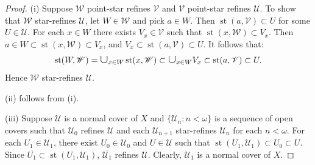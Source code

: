 \documentclass[main.tex]{subfiles}
\begin{document}
\begin{proof} 
	(i) Suppose $\mathscr{W}$ point-star refines $\mathscr{V}$ and $\mathscr{V}$ 
	point-star refines $\mathscr{U}$. To show
	that $\mathscr{W}$ star-refines $\mathscr{U}$, let $W \in \mathscr{W}$ and pick $a \in W$.
	Then $\operatorname{st}(a, \mathscr{V}) \subset U$ for some $U \in \mathscr{U}$. 
	For each $x \in W$ there exists $V_x \in \mathscr{V}$ such that 
	$\operatorname{st}(x, \mathscr{W}) \subset V_x$. Then 
	$a \in W \subset \operatorname{st}(x, \mathscr{W}) \subset V_x$, and 
	$V_x \subset \operatorname{st}(a, \mathscr{V}) \subset U$. It follows that:
	$$\operatorname{st}(W, \mathscr{W}) =  \scalebox{1.4}{$\cup$}_{x \in W} 
	\operatorname{st}(x, \mathscr{W}) \subset  \scalebox{1.4}{$\cup$}_{x \in W} V_x 
	\subset\operatorname{st}(a, \mathscr{V}) \subset U.$$  
	Hence $\mathscr{W}$ star-refines $\mathscr{U}$.  
	
	(ii) follows from (i). 
	
	(iii) Suppose $\mathscr{U}$ is a normal cover of $X$ and $\{\mathscr{U}_n: n<\omega\}$ 
	is a sequence of open covers such that $\mathscr{U}_0$ refines $\mathscr{U}$ and each $\mathscr{U}_{n+1}$ star-refines $\mathscr{U}_n$ for each $n <\omega$. For each $U_1 \in \mathscr{U}_1$, there exist
	$U_0 \in \mathscr{U}_0$ and $U \in \mathscr{U}$ such that 
	$\operatorname{st}(U_1, \mathscr{U}_1) \subset U_0 \subset U$. 
	Since $\overline{U_1} \subset \operatorname{st}(U_1, \mathscr{U}_1)$,
	$\overline{\mathscr{U}_1}$ refines $\mathscr{U}$. 
	Clearly, $\mathscr{U}_1$ is a normal cover of $X$. 
\end{proof} 
\end{document}
